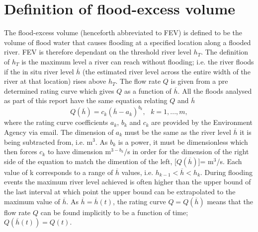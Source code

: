 \documentclass[11pt,a4paper]{article}
\begin{document}
\section{Definition of flood-excess volume}
The flood-excess volume (henceforth abbreviated to FEV) is defined to be the volume of flood water that causes flooding at a specified location along a flooded river. FEV is therefore dependant on the threshold river level $h_T$. The definition of $h_T$ is the maximum level a river can reach without flooding{;} i.e. the river floods if the in situ river level $\overline{h}$ (the estimated river level across the entire width of the river at that location) rises above $h_T$. The flow rate $Q$ is given from a pre determined rating curve which gives $Q$ as a function of $\overline{h}$. All the floods analysed as part of this report have the same equation relating $Q$ and $\overline{h}$
\begin{equation}\tag{2.1}
Q(\overline{h})=c_k (\overline{h}-a_k )^{b_k},\text{ }k=1,...,m,
\end{equation}
where the rating curve coefficients $a_k$, $b_k$ and $c_k$ are provided by the Environment Agency via email. The dimension of $a_k$ must be the same as the river level $\overline{h}$ it is being subtracted from, i.e. m$^3$. As $b_k$ is a power, it must be dimensionless which then forces $c_k$ to have dimension m$^{3-b_k}$/s in order for the dimension of the right side of the equation to match the dimention of the left, [$Q(\overline{h})$]= m$^3$/s. Each value of k corresponds to a range of $\overline{h}$ values, i.e. $h_{k-1}<\overline{h}<h_k$. During flooding events the maximum river level achieved is often higher than the upper bound of the last interval at which point the upper bound can be extrapolated to the maximum value of $\overline{h}$. As $\overline{h}=\overline{h}(t)$, the rating curve $Q=Q(\overline{h})$ means that the flow rate $Q$ can be found implicitly to be a function of time{;} $Q(\overline{h}(t))=Q(t)$.
\end{document}
